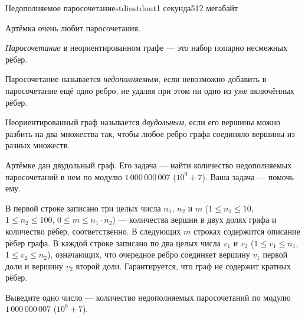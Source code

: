 \begin{problem}{Недополняемое паросочетание}{stdin}{stdout}{1 секунда}{512 мегабайт}

Артёмка очень любит паросочетания.

\textit{Паросочетание} в неориентированном графе --- это набор попарно несмежных рёбер.

Паросочетание называется \textit{недополняемым}, если невозможно добавить в паросочетание ещё одно ребро, не удаляя при этом ни одно из уже включённых рёбер.

Неориентированный граф называется \textit{двудольным}, если его вершины можно разбить на два множества так, чтобы любое ребро графа соединяло вершины из разных множеств.

Артёмке дан двудольный граф. Его задача --- найти количество недополняемых паросочетаний в нем по модулю $1\,000\,000\,007$ ($10^9 + 7$). Ваша задача --- помочь ему.

\InputFile
В первой строке записано три целых числа $n_1$, $n_2$ и $m$ ($1 \le n_1 \le 10$, $1 \le n_2 \le 100$, $0 \le m \le n_1 \cdot n_2$) --- количества вершин в двух долях графа и количество рёбер, соответственно. В следующих $m$ строках содержится описание рёбер графа. В каждой строке записано по два целых числа $v_1$ и $v_2$ ($1 \le v_1 \le n_1$, $1 \le v_2 \le n_2$), означающих, что очередное ребро соединяет вершину $v_1$ первой доли и вершину $v_2$ второй доли. Гарантируется, что граф не содержит кратных рёбер.

\OutputFile
Выведите одно число --- количество недополняемых паросочетаний по модулю $1\,000\,000\,007$ ($10^9 + 7$).

\Examples

\begin{example}
%
%
\end{example}

\end{problem}
